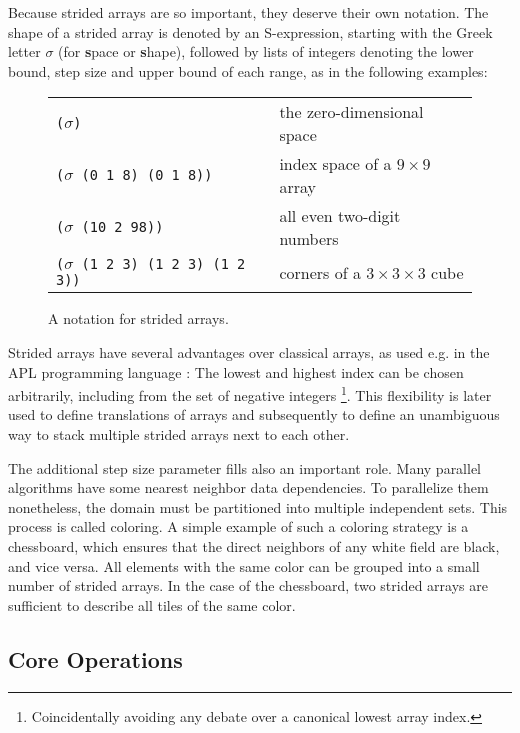 Because strided arrays are so important, they deserve their own
notation. The shape of a strided array is denoted by an S-expression,
starting with the Greek letter $\sigma$ (for \textbf{s}pace or
\textbf{s}hape), followed by lists of integers denoting the lower bound,
step size and upper bound of each range, as in the following examples:

\begin{figure}[h]
\begin{tabular}{ll}
  \texttt{($\sigma$)}                         & \hspace{-1em} the zero-dimensional space \\
  \texttt{($\sigma$ (0 1 8) (0 1 8))}         & \hspace{-1em} index space of a $9 \times 9$ array \\
  \texttt{($\sigma$ (10 2 98))}               & \hspace{-1em} all even two-digit numbers \\
  \texttt{($\sigma$ (1 2 3) (1 2 3) (1 2 3))} & \hspace{-1em} corners of a $3 \times 3 \times 3$ cube \\
\end{tabular}
\caption{A notation for strided arrays.}
\label{fig:sigma-examples}
\end{figure}

Strided arrays have several advantages over classical arrays, as used
e.g. in the APL programming language \cite{APL}: The lowest and highest
index can be chosen arbitrarily, including from the set of negative
integers \footnote{Coincidentally avoiding any debate over a canonical
  lowest array index.}. This flexibility is later used to define
translations of arrays and subsequently to define an unambiguous way to
stack multiple strided arrays next to each other.

The additional step size parameter fills also an important role. Many
parallel algorithms have some nearest neighbor data dependencies. To
parallelize them nonetheless, the domain must be partitioned into multiple
independent sets. This process is called coloring. A simple example of such
a coloring strategy is a chessboard, which ensures that the direct
neighbors of any white field are black, and vice versa. All elements with
the same color can be grouped into a small number of strided arrays. In the
case of the chessboard, two strided arrays are sufficient to describe all
tiles of the same color.

\subsection{Core Operations}

